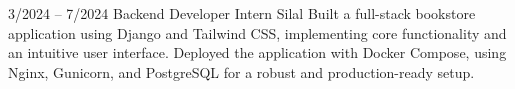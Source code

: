 \documentclass[9pt]{developercv} %
\begin{document}
\begin{entrylist}
    \entry
        {3/2024 -- 7/2024}
        {Backend Developer Intern}
        {Silal}
        {
            {Built a full-stack bookstore application using Django and Tailwind CSS, implementing core functionality and an intuitive user interface. Deployed the application with Docker Compose, using Nginx, Gunicorn, and PostgreSQL for a robust and production-ready setup.}  
        }
\end{entrylist}
\end{document}
